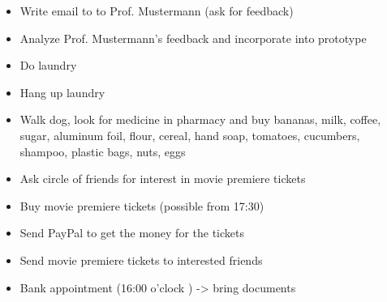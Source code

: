 \begin{itemize}
    \item Write email to to Prof. Mustermann (ask for feedback)
    \item Analyze Prof. Mustermann's feedback and incorporate into prototype
    \item Do laundry
    \item Hang up laundry
    \item Walk dog, look for medicine in pharmacy and buy bananas, milk, coffee, sugar, aluminum foil, flour, cereal, hand soap, tomatoes, cucumbers, shampoo, plastic bags, nuts, eggs
    \item Ask circle of friends for interest in movie premiere tickets
    \item Buy movie premiere tickets (possible from 17:30)
    \item Send PayPal to get the money for the tickets
    \item Send movie premiere tickets to interested friends
    \item Bank appointment (16:00 o'clock ) -> bring documents
\end{itemize}

